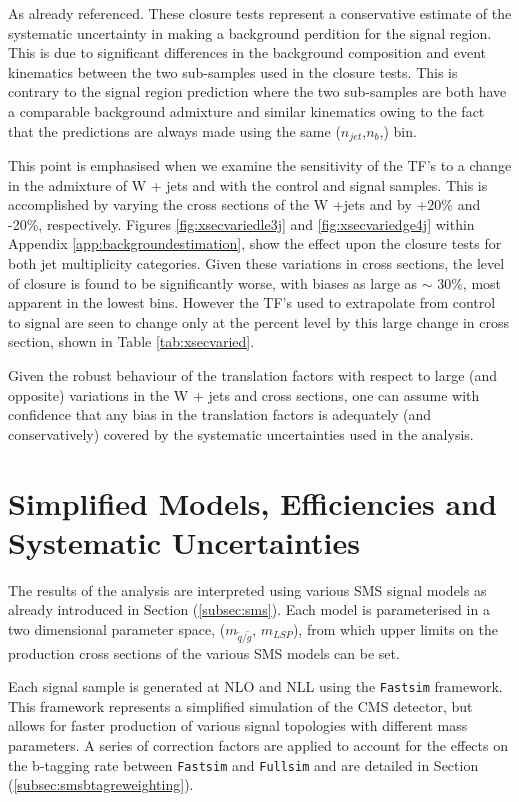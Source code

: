 As already referenced. These closure tests represent a conservative estimate of the systematic uncertainty in making a background perdition for the signal region. This is due to significant differences in the background composition and event kinematics between the two sub-samples used in the closure tests. This is contrary to the signal region prediction where the two sub-samples are both have a comparable background admixture and similar kinematics owing to the fact that the predictions are always made using the same ($n_{jet}$,$n_{b}$,\theht) bin.

This point is emphasised when we examine the sensitivity of the \ac{TF}'s to a change in the admixture of W + jets and \ttbar with the control and signal samples. This is accomplished by varying the cross sections of the W +jets and \ttbar by +20\% and -20\%, respectively. Figures \ref{fig:xsecvariedle3j} and \ref{fig:xsecvariedge4j} within Appendix \ref{app:backgroundestimation}, show the effect upon the closure tests for both jet multiplicity categories. Given these variations in cross sections, the level of closure is found to be significantly worse, with biases as large as $\sim$ 30\%, most apparent in the lowest \theht bins. However the \ac{TF}'s used to extrapolate from control to signal are seen to change only at the percent level by this large change in cross section, shown in Table \ref{tab:xsecvaried}.

Given the robust behaviour of the translation factors with respect to large (and opposite) variations in the W + jets and \ttbar cross sections, one can assume with confidence that any bias in the translation factors is adequately (and conservatively) covered by the systematic uncertainties used in the analysis.

\section{Simplified Models, Efficiencies and Systematic Uncertainties}
\label{sec:smsmodels}

The results of the analysis are interpreted using various \ac{SMS} signal models as already introduced in Section (\ref{subsec:sms}). Each model is parameterised in a two dimensional parameter space, ($m_{\widetilde{q}/\widetilde{g}}$, $m_{LSP}$), from which upper limits on the production cross sections of the various \ac{SMS} models can be set.

Each signal sample is generated at \acf{NLO} and \acf{NLL} \cite{Beenakker:1996ch} using the \texttt{Fastsim} framework. This framework represents a simplified simulation of the \ac{CMS} detector, but allows for faster production of various signal topologies with different mass parameters. A series of correction factors are applied to account for the effects on the b-tagging rate between \texttt{Fastsim} \cite{1742-6596-331-3-032049} and \texttt{Fullsim} \cite{1742-6596-331-3-032015} and are detailed in Section (\ref{subsec:smsbtagreweighting}). 

